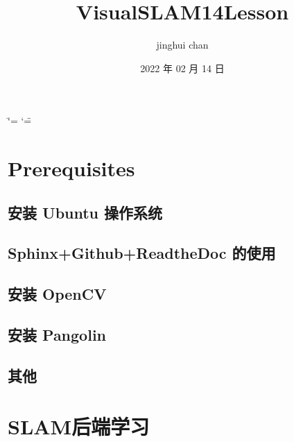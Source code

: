 \documentclass[letterpaper,10pt,english]{sphinxmanual}
\title{VisualSLAM14Lesson}
\date{2022 年 02 月 14 日}
\author{jinghui chan}
\begin{document}
\ifdefined\shorthandoff
  \ifnum\catcode`\=\string=\active\shorthandoff{=}\fi
  \ifnum\catcode`\"=\active{}\fi
\fi

\pagestyle{empty}
\sphinxmaketitle
\pagestyle{plain}
\sphinxtableofcontents
\pagestyle{normal}
\label{\detokenize{index::doc}}



\chapter{Prerequisites}
\label{\detokenize{Prerequisites/prerequisites:prerequisites}}\label{\detokenize{Prerequisites/prerequisites::doc}}

\section{安装 Ubuntu 操作系统}
\label{\detokenize{Prerequisites/InstallOS:ubuntu}}\label{\detokenize{Prerequisites/InstallOS::doc}}

\section{Sphinx+Github+ReadtheDoc 的使用}
\label{\detokenize{Prerequisites/Sphinx+Github+ReadtheDoc:sphinx-github-readthedoc}}\label{\detokenize{Prerequisites/Sphinx+Github+ReadtheDoc::doc}}

\section{安装 OpenCV}
\label{\detokenize{Prerequisites/InstallOpenCV:opencv}}\label{\detokenize{Prerequisites/InstallOpenCV::doc}}

\section{安装 Pangolin}
\label{\detokenize{Prerequisites/InstallPangolin:pangolin}}\label{\detokenize{Prerequisites/InstallPangolin::doc}}

\section{其他}
\label{\detokenize{Prerequisites/Others:id1}}\label{\detokenize{Prerequisites/Others::doc}}

\chapter{SLAM后端学习}
\label{\detokenize{ch9/ch9:slam}}\label{\detokenize{ch9/ch9::doc}}
\end{document}

